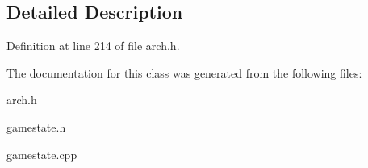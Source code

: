 \subsection{Detailed Description}


Definition at line 214 of file arch.\+h.



The documentation for this class was generated from the following files\+:\begin{DoxyCompactItemize}
\item 
arch.\+h\item 
gamestate.\+h\item 
gamestate.\+cpp\end{DoxyCompactItemize}
